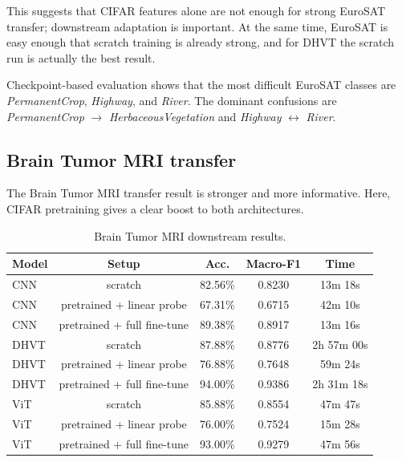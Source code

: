 \documentclass[11pt]{article}
\begin{document}
This suggests that CIFAR features alone are not enough for strong EuroSAT transfer; downstream adaptation is important. At the same time, EuroSAT is easy enough that scratch training is already strong, and for DHVT the scratch run is actually the best result.

Checkpoint-based evaluation shows that the most difficult EuroSAT classes are \textit{PermanentCrop}, \textit{Highway}, and \textit{River}. The dominant confusions are \textit{PermanentCrop} $\rightarrow$ \textit{HerbaceousVegetation} and \textit{Highway} $\leftrightarrow$ \textit{River}.

\subsection{Brain Tumor MRI transfer}
The Brain Tumor MRI transfer result is stronger and more informative. Here, CIFAR pretraining gives a clear boost to both architectures.

\begin{table}[H]
\centering
\caption{Brain Tumor MRI downstream results.}
\begin{tabular}{lcccc}
\toprule
Model & Setup & Acc. & Macro-F1 & Time \\
\midrule
CNN & scratch & 82.56\% & 0.8230 & 13m 18s \\
CNN & pretrained + linear probe & 67.31\% & 0.6715 & 42m 10s \\
CNN & pretrained + full fine-tune & 89.38\% & 0.8917 & 13m 16s \\
DHVT & scratch & 87.88\% & 0.8776 & 2h 57m 00s \\
DHVT & pretrained + linear probe & 76.88\% & 0.7648 & 59m 24s \\
DHVT & pretrained + full fine-tune & 94.00\% & 0.9386 & 2h 31m 18s \\
ViT & scratch & 85.88\% & 0.8554 & 47m 47s \\
ViT & pretrained + linear probe & 76.00\% & 0.7524 & 15m 28s \\
ViT & pretrained + full fine-tune & 93.00\% & 0.9279 & 47m 56s \\
\bottomrule
\end{tabular}
\end{table}
\end{document}
